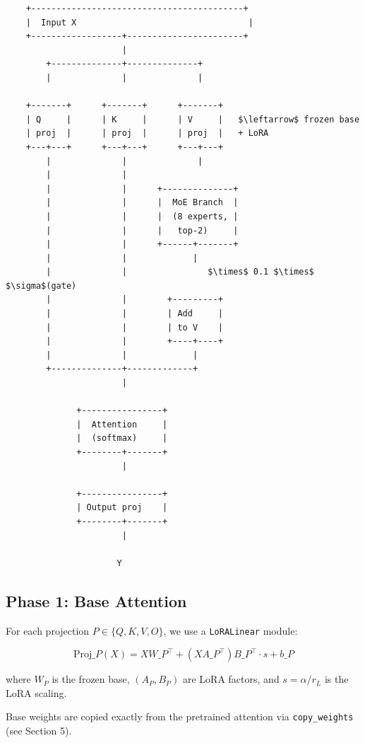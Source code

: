 \begin{lstlisting}
    +------------------------------------------+
    |  Input X                                  |
    +------------------+-----------------------+
                       |
        +--------------+--------------+
        |              |              |
                                       
    +-------+      +-------+      +-------+
    | Q     |      | K     |      | V     |   $\leftarrow$ frozen base
    | proj  |      | proj  |      | proj  |   + LoRA
    +---+---+      +---+---+      +---+---+
        |              |              |
        |              |               
        |              |      +--------------+
        |              |      |  MoE Branch  |
        |              |      |  (8 experts, |
        |              |      |   top-2)     |
        |              |      +------+-------+
        |              |             |
        |              |                $\times$ 0.1 $\times$ $\sigma$(gate)
        |              |        +---------+
        |              |        | Add     |
        |              |        | to V    |
        |              |        +----+----+
        |              |             |
        +--------------+-------------+
                       |
                        
              +----------------+
              |  Attention     |
              |  (softmax)     |
              +--------+-------+
                       |
                        
              +----------------+
              | Output proj    |
              +--------+-------+
                       |
                        
                      Y
\end{lstlisting}

\subsection{Phase 1: Base Attention}

For each projection $P \in \{Q, K, V, O\}$, we use a \texttt{LoRALinear} module:

\[
\text{Proj}\_P(X) = X W\_P^\top + (X A\_P^\top) B\_P^\top \cdot s + b\_P
\]

where $W_P$ is the frozen base, $(A_P, B_P)$ are LoRA factors, and 
$s = \alpha/r_L$ is the LoRA scaling.

Base weights are copied exactly from the pretrained attention via 
\texttt{copy\_weights} (see Section 5).

